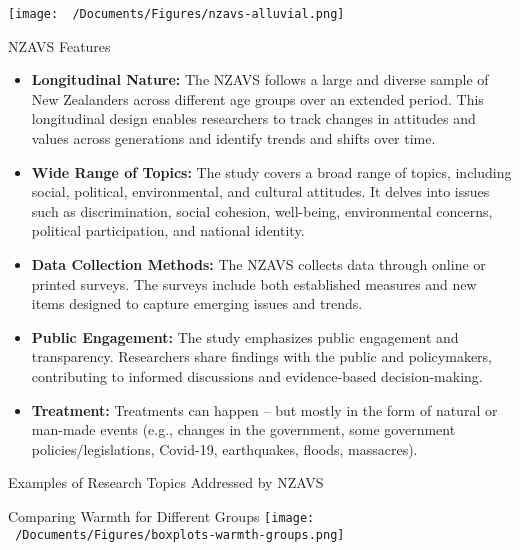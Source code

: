 \documentclass[
  ignorenonframetext,
  aspectratio=169,
]{beamer}
\providecommand{\tightlist}{%
  \setlength{\itemsep}{0pt}\setlength{\parskip}{0pt}}\usepackage{longtable,booktabs,array}
\begin{document}
\begin{frame}
\texttt{[image: ~/Documents/Figures/nzavs-alluvial.png]}
\end{frame}

\begin{frame}{NZAVS Features}
\label{nzavs-features}
\begin{itemize}[<+->]
\tightlist
\item
  \textbf{Longitudinal Nature:} The NZAVS follows a large and diverse
  sample of New Zealanders across different age groups over an extended
  period. This longitudinal design enables researchers to track changes
  in attitudes and values across generations and identify trends and
  shifts over time.
\item
  \textbf{Wide Range of Topics:} The study covers a broad range of
  topics, including social, political, environmental, and cultural
  attitudes. It delves into issues such as discrimination, social
  cohesion, well-being, environmental concerns, political participation,
  and national identity.
\item
  \textbf{Data Collection Methods:} The NZAVS collects data through
  online or printed surveys. The surveys include both established
  measures and new items designed to capture emerging issues and trends.
\end{itemize}
\end{frame}

\begin{frame}
\begin{itemize}[<+->]
\tightlist
\item
  \textbf{Public Engagement:} The study emphasizes public engagement and
  transparency. Researchers share findings with the public and
  policymakers, contributing to informed discussions and evidence-based
  decision-making.
\item
  \textbf{Treatment:} Treatments can happen -- but mostly in the form of
  natural or man-made events (e.g., changes in the government, some
  government policies/legislations, Covid-19, earthquakes, floods,
  massacres).
\end{itemize}
\end{frame}

\begin{frame}{Examples of Research Topics Addressed by NZAVS}
\label{examples-of-research-topics-addressed-by-nzavs}
\end{frame}

\begin{frame}{Comparing Warmth for Different Groups}
\label{comparing-warmth-for-different-groups}
\texttt{[image: ~/Documents/Figures/boxplots-warmth-groups.png]}
\end{frame}
\end{document}
